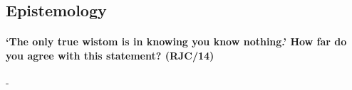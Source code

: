 \documentclass[../../main]{subfiles}
\begin{document}
\subsection{Epistemology}

\paragraph{`The only true wistom is in knowing you know nothing.' How far do you agree with this statement? (RJC/14)}-
\end{document}

